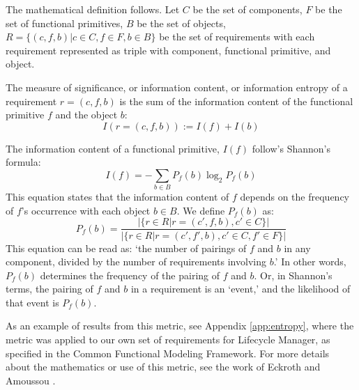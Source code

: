 \documentclass[letterpaper,10pt]{article}
\begin{document}
                The mathematical definition follows. Let $C$ be the
                set of components, $F$ be the set of functional
                primitives, $B$ be the set of objects, $R =
                \{(c,f,b)|c \in C, f \in F, b \in B\}$ be the set of
                requirements with each requirement represented as
                triple with component, functional primitive, and
                object.

                The measure of significance, or information content,
                or information entropy of a requirement $r = (c,f,b)$
                is the sum of the information content of the
                functional primitive $f$ and the object $b$:
                \begin{equation}
                  \label{eq:entropy_of_req}
                  I(r = (c,f,b)) := I(f) + I(b)
                \end{equation}

                The information content of a functional primitive,
                $I(f)$ follow's Shannon's formula:
                \begin{equation}
                  \label{eq:entropy_of_func_prim}
                  I(f) = - \sum_{b \in B} P_f(b) \log_2 P_f(b)
                \end{equation}
                This equation states that the information content of
                $f$ depends on the frequency of $f$'s occurrence with
                each object $b \in B$. We define $P_f(b)$ as:
                \begin{equation}
                  \label{eq:prob_of_func_prim}
                  P_f(b) = \frac{|\{r \in R|r = (c',f,b), c' \in C\}|}
                  {|\{r \in R|r = (c',f',b), c' \in C, f' \in F\}|}
                \end{equation}
                This equation can be read as: `the number of pairings
                of $f$ and $b$ in any component, divided by the number
                of requirements involving $b$.' In other words,
                $P_f(b)$ determines the frequency of the pairing of
                $f$ and $b$. Or, in Shannon's terms, the pairing of
                $f$ and $b$ in a requirement is an `event,' and the
                likelihood of that event is $P_f(b)$.

                As an example of results from this metric, see
                Appendix \ref{app:entropy}, where the metric was
                applied to our own set of requirements for Lifecycle
                Manager, as specified in the Common Functional
                Modeling Framework. For more details about the
                mathematics or use of this metric, see the work of
                Eckroth and Amoussou \cite{eckroth}.
		
\end{document}
